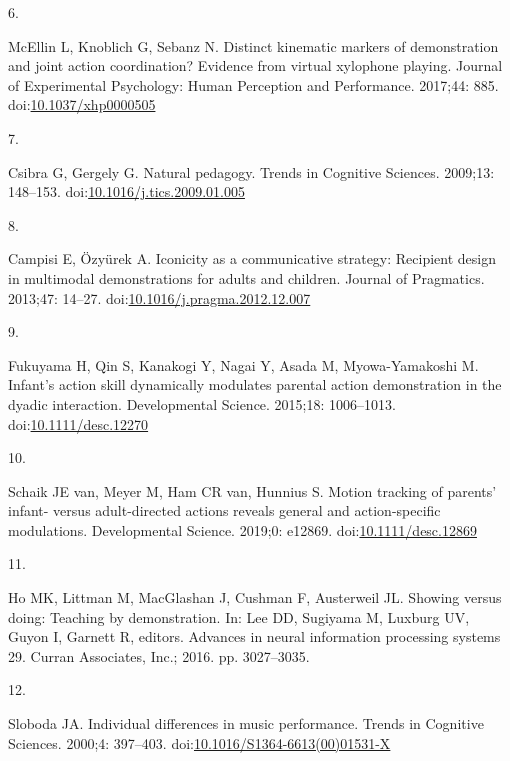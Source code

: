 \documentclass[
  english,
  man,floatsintext]{apa6}
\newlength{\cslhangindent}
\newlength{\csllabelwidth}
\newlength{\cslentryspacingunit} %
\newenvironment{CSLReferences}[2] %
 {%
  \setlength{\parindent}{0pt}
  \ifodd #1
  \let\oldpar\par
  \def\par{\hangindent=\cslhangindent\oldpar}
  \fi
  \setlength{\parskip}{#2\cslentryspacingunit}
 }%
 {}
\newcommand{\CSLLeftMargin}[1]{\parbox[t]{\csllabelwidth}{#1}}
\newcommand{\CSLRightInline}[1]{\parbox[t]{\linewidth - \csllabelwidth}{#1}\break}
\begin{document}
\begin{CSLReferences}{0}{0}
\leavevmode{}%
\CSLLeftMargin{6. }
\CSLRightInline{McEllin L, Knoblich G, Sebanz N. Distinct kinematic markers of demonstration and joint action coordination? {Evidence} from virtual xylophone playing. Journal of Experimental Psychology: Human Perception and Performance. 2017;44: 885. doi:\href{https://doi.org/10.1037/xhp0000505}{10.1037/xhp0000505}}

\leavevmode{}%
\CSLLeftMargin{7. }
\CSLRightInline{Csibra G, Gergely G. Natural pedagogy. Trends in Cognitive Sciences. 2009;13: 148--153. doi:\href{https://doi.org/10.1016/j.tics.2009.01.005}{10.1016/j.tics.2009.01.005}}

\leavevmode{}%
\CSLLeftMargin{8. }
\CSLRightInline{Campisi E, Özyürek A. Iconicity as a communicative strategy: {Recipient} design in multimodal demonstrations for adults and children. Journal of Pragmatics. 2013;47: 14--27. doi:\href{https://doi.org/10.1016/j.pragma.2012.12.007}{10.1016/j.pragma.2012.12.007}}

\leavevmode{}%
\CSLLeftMargin{9. }
\CSLRightInline{Fukuyama H, Qin S, Kanakogi Y, Nagai Y, Asada M, Myowa-Yamakoshi M. Infant's action skill dynamically modulates parental action demonstration in the dyadic interaction. Developmental Science. 2015;18: 1006--1013. doi:\href{https://doi.org/10.1111/desc.12270}{10.1111/desc.12270}}

\leavevmode{}%
\CSLLeftMargin{10. }
\CSLRightInline{Schaik JE van, Meyer M, Ham CR van, Hunnius S. Motion tracking of parents' infant- versus adult-directed actions reveals general and action-specific modulations. Developmental Science. 2019;0: e12869. doi:\href{https://doi.org/10.1111/desc.12869}{10.1111/desc.12869}}

\leavevmode{}%
\CSLLeftMargin{11. }
\CSLRightInline{Ho MK, Littman M, MacGlashan J, Cushman F, Austerweil JL. Showing versus doing: {Teaching} by demonstration. In: Lee DD, Sugiyama M, Luxburg UV, Guyon I, Garnett R, editors. Advances in neural information processing systems 29. {Curran Associates, Inc.}; 2016. pp. 3027--3035. }

\leavevmode{}%
\CSLLeftMargin{12. }
\CSLRightInline{Sloboda JA. Individual differences in music performance. Trends in Cognitive Sciences. 2000;4: 397--403. doi:\href{https://doi.org/10.1016/S1364-6613(00)01531-X}{10.1016/S1364-6613(00)01531-X}}


\end{CSLReferences}
\end{document}

